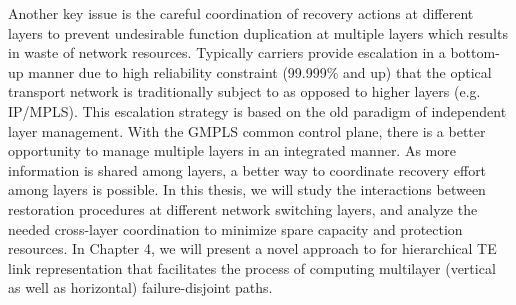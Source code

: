 Another key issue is the careful coordination of recovery actions
at different layers to prevent undesirable function duplication at
multiple layers which results in waste of network resources. Typically
carriers provide escalation in a bottom-up manner due to high reliability
constraint (99.999\% and up) that the optical transport network is
traditionally subject to as opposed to higher layers (e.g. IP/MPLS).
This escalation strategy is based on the old paradigm of independent
layer management. With the GMPLS common control plane, there is a
better opportunity to manage multiple layers in an integrated manner.
As more information is shared among layers, a better way to coordinate
recovery effort among layers is possible. In this thesis, we will
study the interactions between restoration procedures at different
network switching layers, and analyze the needed cross-layer coordination
to minimize spare capacity and protection resources. In Chapter 4,
we will present a novel approach to for hierarchical TE link representation
that facilitates the process of computing multilayer (vertical as
well as horizontal) failure-disjoint paths. 

